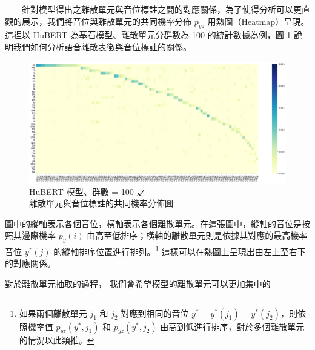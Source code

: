 　　針對模型得出之離散單元與音位標註之間的對應關係，為了使得分析可以更直觀的展示，我們將音位與離散單元的共同機率分佈 \(p_{yz}\) 用熱圖（Heatmap）呈現。這裡以 HuBERT 為基石模型、離散單元分群數為 100 的統計數據為例，圖 \ref{fig:joint-byprob-hub100} 說明我們如何分析語音離散表徵與音位標註的關係。
    {    
        \begin{figure}[ht]
            \centering
            \includegraphics[width=1\linewidth]{figures/joint_sortby_prphn-hub-100.png}
            \caption{HuBERT 模型、群數 = 100 之 \\ 
            離散單元與音位標註的共同機率分佈圖}
            \label{fig:joint-byprob-hub100}
        \end{figure} 
    }
        圖中的縱軸表示各個音位，橫軸表示各個離散單元。在這張圖中，縱軸的音位是按照其邊際機率 \(p_y(i)\) 由高至低排序；橫軸的離散單元則是依據其對應的最高機率音位 \(y^\ast(j)\) 的縱軸排序位置進行排列。\footnote{如果兩個離散單元 \(j_1\) 和 \(j_2\) 對應到相同的音位 \(y^\ast = y^\ast(j_1) = y^\ast(j_2)\)，則依照機率值 \(p_{yz}(y^\ast, j_1)\) 和 \(p_{yz}(y^\ast, j_2)\) 由高到低進行排序，對於多個離散單元的情況以此類推。} 這樣可以在熱圖上呈現出由左上至右下的對應關係。

        對於離散單元抽取的過程，
我們會希望模型的離散單元可以更加集中的